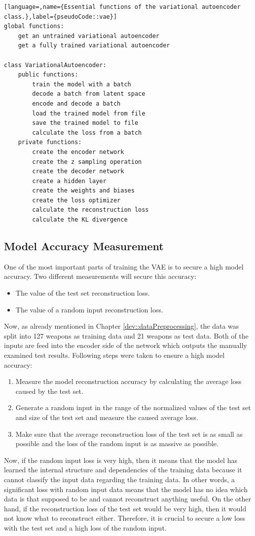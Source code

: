 \documentclass[MGS,Master,english]{twbook}%
\begin{document}
\begin{lstlisting}[language=,name={Essential functions of the variational autoencoder class.},label={pseudoCode::vae}]
global functions:
	get an untrained variational autoencoder
	get a fully trained variational autoencoder
	
class VariationalAutoencoder:
	public functions:
		train the model with a batch
		decode a batch from latent space
		encode and decode a batch
		load the trained model from file
		save the trained model to file
		calculate the loss from a batch
	private functions:
		create the encoder network
		create the z sampling operation
		create the decoder network
		create a hidden layer
		create the weights and biases
		create the loss optimizer
		calculate the reconstruction loss
		calculate the KL divergence
\end{lstlisting}

\subsection{Model Accuracy Measurement}
One of the most important parts of training the VAE is to secure a high model accuracy. Two different measurements will secure this accuracy:
\begin{itemize}
	\item The value of the test set reconstruction loss.
	\item The value of a random input reconstruction loss.
\end{itemize} 
Now, as already mentioned in Chapter \ref{dev::dataPreprocessing}, the data was split into 127 weapons as training data and 21 weapons as test data. Both of the inputs are feed into the encoder side of the network which outputs the manually examined test results. Following steps were taken to ensure a high model accuracy:
\begin{enumerate}
	\item Measure the model reconstruction accuracy by calculating the average loss caused by the test set.
	\item Generate a random input in the range of the normalized values of the test set and size of the test set and measure the caused average loss.
	\item Make sure that the average reconstruction loss of the test set is as small as possible and the loss of the random input is as massive as possible.
\end{enumerate}
Now, if the random input loss is very high, then it means that the model has learned the internal structure and dependencies of the training data because it cannot classify the input data regarding the training data. In other words, a significant loss with random input data means that the model has no idea which data is that supposed to be and cannot reconstruct anything useful. On the other hand, if the reconstruction loss of the test set would be very high, then it would not know what to reconstruct either. Therefore, it is crucial to secure a low loss with the test set and a high loss of the random input.
\end{document}
